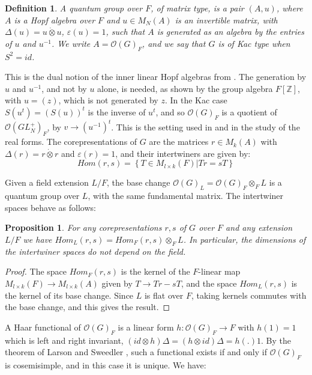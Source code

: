 \documentclass[11pt]{amsart}
\newtheorem{proposition}[theorem]{Proposition}
\newtheorem{definition}[theorem]{Definition}
\theoremstyle{definition}
\begin{document}
\begin{definition}
A quantum group over $F$, of matrix type, is a pair $(A,u)$, where $A$ is a Hopf algebra over $F$ and $u\in M_N(A)$ is an invertible matrix, with $\Delta(u)=u\dot\otimes u$, $\varepsilon(u)=1$, such that $A$ is generated as an algebra by the entries of $u$ and $u^{-1}$. We write $A=\mathcal O(G)_F$, and we say that $G$ is of Kac type when $S^2=id$.
\end{definition}

This is the dual notion of the inner linear Hopf algebras from \cite{abi}. The generation by $u$ and $u^{-1}$, and not by $u$ alone, is needed, as shown by the group algebra $F[\mathbb Z]$, with $u=(z)$, which is not generated by $z$. In the Kac case $S(u^t)=(S(u))^t$ is the inverse of $u^t$, and so $\mathcal O(G)_F$ is a quotient of $\mathcal O(GL_N^+)_F$, by $v\to(u^{-1})^t$. This is the setting used in \cite{bop} and in the study of the real forms. The corepresentations of $G$ are the matrices $r\in M_k(A)$ with $\Delta(r)=r\dot\otimes r$ and $\varepsilon(r)=1$, and their intertwiners are given by:
$$Hom(r,s)=\left\{T\in M_{l\times k}(F)\Big|Tr=sT\right\}$$

Given a field extension $L/F$, the base change $\mathcal O(G)_L=\mathcal O(G)_F\otimes_FL$ is a quantum group over $L$, with the same fundamental matrix. The intertwiner spaces behave as follows:

\begin{proposition}
\label{p12}
For any corepresentations $r,s$ of $G$ over $F$ and any extension $L/F$ we have $Hom_L(r,s)=Hom_F(r,s)\otimes_FL$. In particular, the dimensions of the intertwiner spaces do not depend on the field.
\end{proposition}

\begin{proof}
The space $Hom_F(r,s)$ is the kernel of the $F$-linear map $M_{l\times k}(F)\to M_{l\times k}(A)$ given by $T\to Tr-sT$, and the space $Hom_L(r,s)$ is the kernel of its base change. Since $L$ is flat over $F$, taking kernels commutes with the base change, and this gives the result.
\end{proof}

A Haar functional of $\mathcal O(G)_F$ is a linear form $h:\mathcal O(G)_F\to F$ with $h(1)=1$ which is left and right invariant, $(id\otimes h)\Delta=(h\otimes id)\Delta=h(.)1$. By the theorem of Larson and Sweedler \cite{swe}, such a functional exists if and only if $\mathcal O(G)_F$ is cosemisimple, and in this case it is unique. We have:
\end{document}
